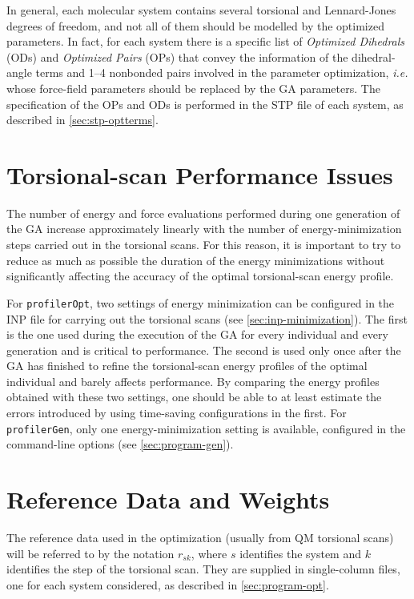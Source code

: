 \documentclass[10pt,a4paper,openany]{memoir}
\numberwithin{equation}{section}
\newcommand{\profileropt}[0]{\texttt{profilerOpt}}
\newcommand{\profilergen}[0]{\texttt{profilerGen}}
\begin{document}
In general, each molecular system contains several torsional and
Lennard-Jones degrees of freedom, and not all of them should be
modelled by the optimized parameters. In fact, for each system there
is a specific list of \textit{Optimized Dihedrals} (ODs) and
\textit{Optimized Pairs} (OPs) that convey the information of the
dihedral-angle terms and 1--4 nonbonded pairs involved in the
parameter optimization, \textit{i.e.} whose force-field parameters
should be replaced by the GA parameters. The specification of the OPs
and ODs is performed in the STP file of each system, as described in
\autoref{sec:stp-optterms}.

\section{Torsional-scan Performance Issues}
\label{sec:torsional-scan-performance-issues}

The number of energy and force evaluations performed during one
generation of the GA increase approximately linearly with the number
of energy-minimization steps carried out in the torsional scans.  For
this reason, it is important to try to reduce as much as possible the
duration of the energy minimizations without significantly affecting
the accuracy of the optimal torsional-scan energy profile.

For \profileropt{}, two settings of energy minimization can be
configured in the INP file for carrying out the torsional scans (see
\autoref{sec:inp-minimization}). The first is the one used during the
execution of the GA for every individual and every generation and is
critical to performance.  The second is used only once after the GA
has finished to refine the torsional-scan energy profiles of the
optimal individual and barely affects performance. By comparing the
energy profiles obtained with these two settings, one should be able
to at least estimate the errors introduced by using time-saving
configurations in the first. For \profilergen{}, only one
energy-minimization setting is available, configured in the
command-line options (see \autoref{sec:program-gen}).

\section{Reference Data and Weights}
\label{sec:ga-fitness-wei}

The reference data used in the optimization (usually from QM torsional
scans) will be referred to by the notation $r_{sk}$, where $s$
identifies the system and $k$ identifies the step of the torsional
scan.  They are supplied in single-column files, one for each system
considered, as described in \autoref{sec:program-opt}.
\end{document}
